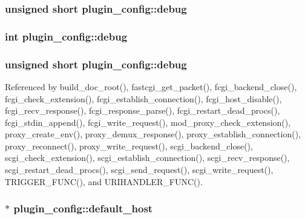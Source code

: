 \hypertarget{structplugin__config_a8d6b7c8c9974668b8a6cf70e7b7a33ac}{
\subsubsection[{debug}]{\setlength{\rightskip}{0pt plus 5cm}unsigned short plugin\-\_\-config\-::debug}}\label{structplugin__config_a8d6b7c8c9974668b8a6cf70e7b7a33ac}
\hypertarget{structplugin__config_a18e3f718ad48747d2c0f7c3aa2dca62d}{
\subsubsection[{debug}]{\setlength{\rightskip}{0pt plus 5cm}int plugin\-\_\-config\-::debug}}\label{structplugin__config_a18e3f718ad48747d2c0f7c3aa2dca62d}
\hypertarget{structplugin__config_a8d6b7c8c9974668b8a6cf70e7b7a33ac}{
\subsubsection[{debug}]{\setlength{\rightskip}{0pt plus 5cm}unsigned short plugin\-\_\-config\-::debug}}\label{structplugin__config_a8d6b7c8c9974668b8a6cf70e7b7a33ac}


Referenced by build\-\_\-doc\-\_\-root(), fastcgi\-\_\-get\-\_\-packet(), fcgi\-\_\-backend\-\_\-close(), fcgi\-\_\-check\-\_\-extension(), fcgi\-\_\-establish\-\_\-connection(), fcgi\-\_\-host\-\_\-disable(), fcgi\-\_\-recv\-\_\-response(), fcgi\-\_\-response\-\_\-parse(), fcgi\-\_\-restart\-\_\-dead\-\_\-procs(), fcgi\-\_\-stdin\-\_\-append(), fcgi\-\_\-write\-\_\-request(), mod\-\_\-proxy\-\_\-check\-\_\-extension(), proxy\-\_\-create\-\_\-env(), proxy\-\_\-demux\-\_\-response(), proxy\-\_\-establish\-\_\-connection(), proxy\-\_\-reconnect(), proxy\-\_\-write\-\_\-request(), scgi\-\_\-backend\-\_\-close(), scgi\-\_\-check\-\_\-extension(), scgi\-\_\-establish\-\_\-connection(), scgi\-\_\-recv\-\_\-response(), scgi\-\_\-restart\-\_\-dead\-\_\-procs(), scgi\-\_\-send\-\_\-request(), scgi\-\_\-write\-\_\-request(), T\-R\-I\-G\-G\-E\-R\-\_\-\-F\-U\-N\-C(), and U\-R\-I\-H\-A\-N\-D\-L\-E\-R\-\_\-\-F\-U\-N\-C().

\hypertarget{structplugin__config_af5f66a923a5857c6c7ede0bd5be2f624}{
\subsubsection[{default\-\_\-host}]{$\ast$ plugin\-\_\-config\-::default\-\_\-host}}\label{structplugin__config_af5f66a923a5857c6c7ede0bd5be2f624}


